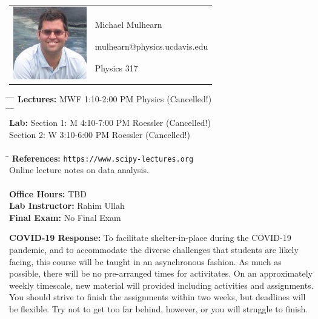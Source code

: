 \documentclass[12pt]{article}
\begin{document}
\begin{tabular}{ l l }
  \multirow{6}{*}{\includegraphics[height=1.25in]{mike.jpg}} & \\
  & \\
  & \large Michael Mulhearn \\
  & \large mulhearn@physics.ucdavis.edu \\
  & \large Physics 317 \\
  & \\
\end{tabular}
\vskip 0.5cm
\noindent
\begin{tabbing}
\hspace*{9em}\= \hspace*{10em} \= \hspace*{6em} \= \kill %
\textbf {Lectures:} \> MWF  1:10-2:00 PM  Physics (Cancelled!)\\
\hspace*{9em}\= \hspace*{5em} \= \hspace*{8em} \= \kill %
\\
\textbf {Lab:}    \> Section 1: \>  M 4:10-7:00 PM  Roessler (Cancelled!)\\
                        \> Section 2: \> W 3:10-6:00 PM  Roessler (Cancelled!)\\
\\
\hspace*{9em}\= \kill %
\textbf {References:}  \>  {\tt https://www.scipy-lectures.org} \\
\> Online lecture notes on data analysis. \\
\\
\textbf{Office Hours:} \> TBD \\
\textbf{Lab Instructor:} \> Rahim Ullah \\
\textbf{Final Exam:} \> No Final Exam \\
\end{tabbing}

\noindent
\textbf {COVID-19 Response:}
To facilitate shelter-in-place during the COVID-19 pandemic, and to
accommodate the diverse challenges that students are likely facing,
this course will be taught in an asynchronous fashion.  As much as
possible, there will be no pre-arranged times for activitates.  On an
approximately weekly timescale, new material will provided including
activities and assignments.  You should strive to finish the
assignments within two weeks, but deadlines will be flexible.  Try not
to get too far behind, however, or you will struggle to finish.
\end{document}
